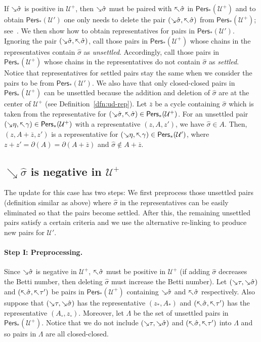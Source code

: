 \documentclass[letterpaper,11pt]{article}
\theoremstyle{mythmstyle}
\theoremstyle{mydefstyle}
\theoremstyle{plain}
\theoremstyle{definition}
\newcommand{\Pers}{\mathsf{Pers}}
\renewcommand{\bar}[1]{\overline{#1}}
\newcommand{\<}[1]{\langle #1\rangle}
\newcommand{\add}[1]{\mskip-2.5mu\rotatebox[origin=c]{-45}{${\rightarrow}$}{#1}}
\newcommand{\del}[1]{\mskip-2.5mu\rotatebox[origin=c]{-45}{${\leftarrow}$}{#1}}
\newcommand{\Ucal}{\mathcal{U}}
\newcommand{\LG}{\Lambda}
\newcommand{\sG}{\sigma}
\begin{document}
If $\add{\hat{\sG}}$ is positive in $\Ucal^+$,
then $\add{\hat{\sG}}$ must be paired with $\del{\hat{\sG}}$
in $\Pers_*(\Ucal^+)$
and to obtain $\Pers_*(\Ucal')$
one only needs to delete the pair $(\add{\hat{\sG}},\del{\hat{\sG}})$
from $\Pers_*(\Ucal^+)$; see~\cite[Theorem 2.2]{maria2014zigzag}.
We then show how to obtain  representatives for pairs in $\Pers_*(\Ucal')$.
Ignoring the pair $(\add{\hat{\sG}},\del{\hat{\sG}})$,
call those pairs in $\Pers_*(\Ucal^+)$ 
whose chains in the representatives contain $\hat{\sG}$
as \emph{unsettled}.
 Accordingly,
call those 
pairs in $\Pers_*(\Ucal^+)$ 
whose chains in the representatives do not contain $\hat{\sG}$
as \emph{settled}.
Notice that
representatives for settled pairs stay
the same 
when we consider the pairs to be from $\Pers_*(\Ucal')$.
We also have that only closed-closed pairs in $\Pers_*(\Ucal^+)$  
can be unsettled
because the addition and deletion of $\hat{\sG}$ are at the center of $\Ucal^+$
(see Definition~\ref{dfn:ud-rep}).
Let $\bar{z}$ be a cycle containing $\hat{\sG}$ which is
taken from the representative for $(\add{\hat{\sG}},\del{\hat{\sG}})\in\Pers_*(\Ucal^+)$.
For an unsettled pair $(\add{\eta},\del{\gamma})\in\Pers_*(\Ucal^+)$
with a representative $(z,A,z')$,
we have  $\hat{\sG}\in A$.
Then, $(z,A+\bar{z},z')$
is a representative for 
$(\add{\eta},\del{\gamma})\in\Pers_*(\Ucal')$,
where  $z+z'=\partial(A)=\partial(A+\bar{z})$
and $\hat{\sG}\not\in A+\bar{z}$.


\subsection{${\scriptstyle \searrow}\hat{\sG}$ is negative in $\Ucal^+$}


The update for this case has two steps:
We first preprocess those unsettled
pairs (definition similar as above) where
$\hat{\sG}$ in the representatives
can be easily eliminated
so that the pairs become settled.
After this, the remaining unsettled
pairs satisfy a certain criteria and we use
the alternative re-linking to produce new pairs
for $\Ucal'$.

\paragraph{Step I: Preprocessing.}
Since $\add{\hat{\sG}}$ is negative in $\Ucal^+$,
 $\del{\hat{\sG}}$ must be positive in $\Ucal^+$
(if adding $\hat{\sG}$ decreases the Betti number,
then deleting $\hat{\sG}$ must increase the Betti number).
Let $(\add{\tau},\add{\hat{\sG}})$ and $(\del{\hat{\sG}},\del{\tau'})$
be pairs in $\Pers_*(\Ucal^+)$ containing 
$\add{\hat{\sG}}$ and $\del{\hat{\sG}}$ respectively.
Also suppose that $(\add{\tau},\add{\hat{\sG}})$ 
has the representative $(z_*,A_*)$ and
$(\del{\hat{\sG}},\del{\tau'})$ has the representative $(A_\circ,z_\circ)$.
Moreover, let $\LG$ be the set of unsettled pairs 
in $\Pers_*(\Ucal^+)$.
Notice that
we do not include 
$(\add{\tau},\add{\hat{\sG}})$ and $(\del{\hat{\sG}},\del{\tau'})$
into $\LG$
and so pairs in $\LG$ are all closed-closed.
\end{document}
